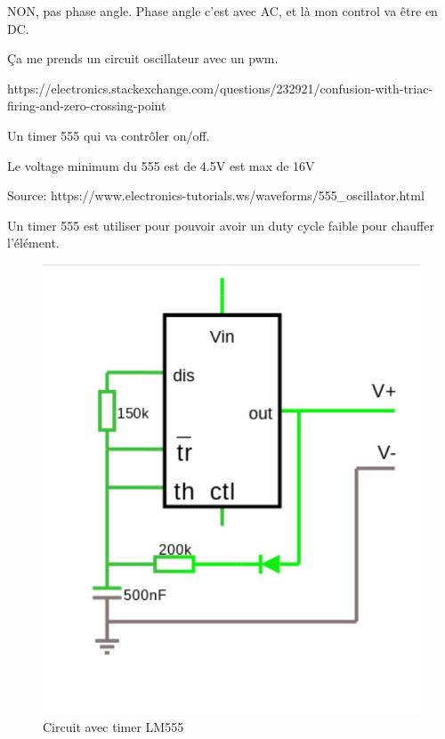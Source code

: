 \documentclass{article}
\begin{document}
NON, pas phase angle. Phase angle c'est avec AC, et là mon control va être en DC.

Ça me prends un circuit oscillateur avec un pwm.

https://electronics.stackexchange.com/questions/232921/confusion-with-triac-firing-and-zero-crossing-point

Un timer 555 qui va contrôler on/off.

Le voltage minimum du 555 est de 4.5V est max de 16V

Source: https://www.electronics-tutorials.ws/waveforms/555_oscillator.html

Un timer 555 est utiliser pour pouvoir avoir un duty cycle faible pour chauffer l'élément.


\begin{figure}
    \centering
    \includegraphics[scale=0.25]{timer555.png}
    \caption{Circuit avec timer LM555}
    \label{fig:my_label}
\end{figure}
\end{document}
